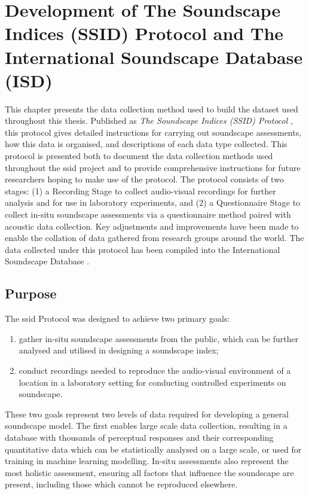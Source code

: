 \chapter{Development of The Soundscape Indices (SSID) Protocol and The International Soundscape Database (ISD)}
\label{chap:protocol}

This chapter presents the data collection method used to build the dataset used throughout this thesis. Published as \emph{The Soundscape Indices (SSID) Protocol} \citep{Mitchell2020Soundscape}, this protocol gives detailed instructions for carrying out soundscape assessments, how this data is organised, and descriptions of each data type collected. This protocol is presented both to document the data collection methods used throughout the \gls{ssid} project and to provide comprehensive instructions for future researchers hoping to make use of the protocol. The protocol consists of two stages: (1) a Recording Stage to collect audio-visual recordings for further analysis and for use in laboratory experiments, and (2) a Questionnaire Stage to collect in-situ soundscape assessments via a questionnaire method paired with acoustic data collection. Key adjustments and improvements have been made to enable the collation of data gathered from research groups around the world. The data collected under this protocol has been compiled into the International Soundscape Database \citep{Mitchell2021International}. 

\section{Purpose}

 The \gls{ssid} Protocol was designed to achieve two primary goals:
 \begin{enumerate}
   \item gather in-situ soundscape assessments from the public, which can be further analysed and utilised in designing a soundscape index;
   \item conduct recordings needed to reproduce the audio-visual environment of a location in a laboratory setting for conducting controlled experiments on soundscape.
 \end{enumerate}

 These two goals represent two levels of data required for developing a general soundscape model. The first enables large scale data collection, resulting in a database with thousands of perceptual responses and their corresponding quantitative data which can be statistically analysed on a large scale, or used for training in machine learning modelling. In-situ assessments also represent the most holistic assessment, ensuring all factors that influence the soundscape are present, including those which cannot be reproduced elsewhere.

